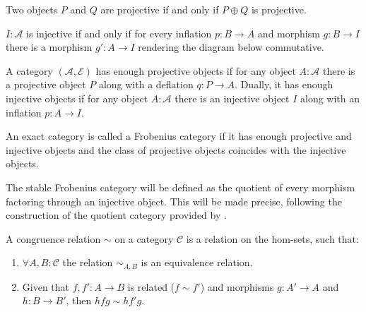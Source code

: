     \begin{corollary}
        Two objects $P$ and $Q$ are projective if and only if $P\oplus Q$ is projective.
    \end{corollary}

    \begin{corollary}
        $I:\mathcal{A}$ is injective if and only if for every inflation $p:B\rightarrow A$ and morphism $g:B\rightarrow I$ there is a morphism $g':A\rightarrow I$ rendering the diagram below commutative.
        \begin{center}
        \end{center}
    \end{corollary}

    \begin{definition}
        A category $(\mathcal{A}, \mathcal{E})$ has enough projective objects if for any object $A:\mathcal{A}$ there is a projective object $P$ along with a deflation $q:P\rightarrow A$. Dually, it has enough injective objects if for any object $A:\mathcal{A}$ there is an injective object $I$ along with an inflation $p:A\rightarrow I$.
    \end{definition}

    \begin{definition}
        An exact category is called a Frobenius category if it has enough projective and injective objects and the class of projective objects coincides with the injective objects.
    \end{definition}

    The stable Frobenius category will be defined as the quotient of every morphism factoring through an injective object. This will be made precise, following the construction of the quotient category provided by \cite{Mac71}.

    \begin{definition}
        A congruence relation $\sim$ on a category $\mathcal{C}$ is a relation on the hom-sets, such that:
        \begin{enumerate}
            \item $\forall A,B:\mathcal{C}$ the relation $\sim_{A,B}$ is an equivalence relation.
            \item Given that $f,f':A\rightarrow B$ is related ($f\sim f'$) and morphisms $g:A'\rightarrow A$ and $h:B\rightarrow B'$, then $hfg\sim hf'g$.
        \end{enumerate}
    \end{definition}

